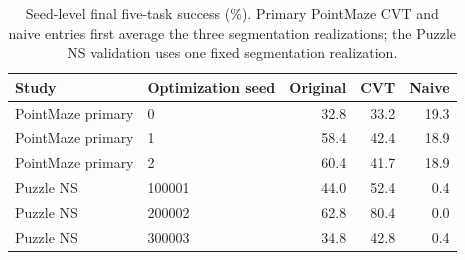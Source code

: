 \begin{table}[h]
\centering
\small
\begin{tabular}{llrrr}
\toprule
Study & Optimization seed & Original & CVT & Naive \\
\midrule
PointMaze primary & 0 & 32.8 & 33.2 & 19.3 \\
PointMaze primary & 1 & 58.4 & 42.4 & 18.9 \\
PointMaze primary & 2 & 60.4 & 41.7 & 18.9 \\
\midrule
Puzzle NS & 100001 & 44.0 & 52.4 & 0.4 \\
Puzzle NS & 200002 & 62.8 & 80.4 & 0.0 \\
Puzzle NS & 300003 & 34.8 & 42.8 & 0.4 \\
\bottomrule
\end{tabular}
\caption{Seed-level final five-task success (\%). Primary PointMaze CVT and naive entries first average the three segmentation realizations; the Puzzle NS validation uses one fixed segmentation realization.}
\label{tab:seed-results}
\end{table}
